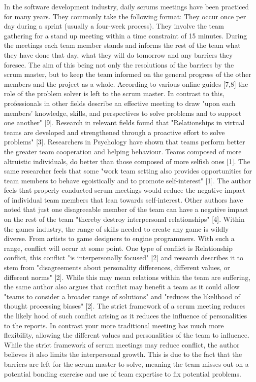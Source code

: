\documentclass{scrartcl}
\begin{document}
In the software development industry, daily scrums meetings have been practiced for many years. They commonly take the following format:
 They occur once per day during a sprint (usually a four-week process). 
They involve the team gathering for a stand up meeting within a time constraint of 15 minutes. 
During the meetings each team member stands and informs the rest of the team what they have done that day, what they will do tomorrow and any barriers they foresee.
The aim of this being not only the resolutions of the barriers by the scrum master, but to keep the team informed on the general progress of the other members and the project as a whole. 
 According to various online guides [7,8] the role of the problem solver is left to the scrum master. In contrast to this, professionals in other fields describe an effective meeting to draw "upon each members' knowledge, skills, and perspectives to solve problems and to support one another" [9]. Research in relevant fields found that "Relationships in virtual teams are developed and strengthened through a proactive effort to solve problems" [3]. 
Researchers in Psychology have shown that teams perform better the greater team cooperation and helping behaviour. Teams composed of more altruistic individuals, do better than those composed of more selfish ones [1].  The same researcher feels that some "work team setting also provides opportunities for team members to behave egoistically and to promote self-interest" [1]. The author feels that properly conducted scrum meetings would reduce the negative impact of individual team members that lean towards self-interest. Other authors have noted that just one disagreeable member of the team can have a negative impact on the rest of the team "thereby destroy interpersonal relationships" [4].
Within the games industry, the range of skills needed to create any game is wildly diverse. From artists to game designers to engine programmers. With such a range, conflict will occur at some point. One type of conflict is Relationship conflict, this conflict "is interpersonally focused" [2] and research describes it to stem from "disagreements about personality differences, different values, or different norms" [2]. While this may mean relations within the team are suffering, the same author also argues that conflict may benefit a team as it could allow "teams to consider a broader range of solutions" and "reduces the likelihood of thought processing biases" [2]. The strict framework of a scrum meeting reduces the likely hood of such conflict arising as it reduces the influence of personalities to the reports. In contrast your more traditional meeting has much more flexibility, allowing the different values and personalities of the team to influence. While the strict framework of scrum meetings may reduce conflict, the author believes it also limits the interpersonal growth. This is due to the fact that the barriers are left for the scrum master to solve, meaning the team misses out on a potential bonding exercise and use of team expertise to fix potential problems.
\end{document}
